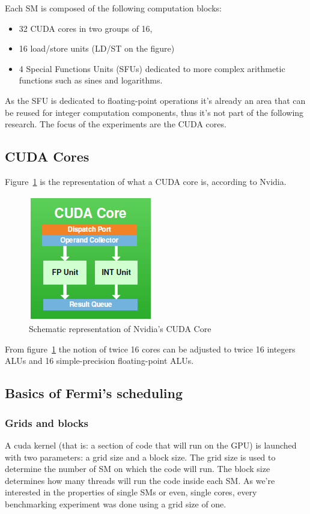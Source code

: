 \documentclass{article}
\begin{document}
    Each SM is composed of the following computation blocks:
    \begin{itemize}
        \item 32 CUDA cores in two groups of 16,
        \item 16 load/store units (LD/ST on the figure)
        \item 4 Special Functions Units (SFUs) dedicated to more complex
              arithmetic functions such as sines and logarithms.
    \end{itemize}
    
    As the SFU is dedicated to floating-point operations it's already an area
    that can be reused for integer computation components, thus it's not part
    of the following research. The focus of the experiments are the CUDA cores.

    \subsection{CUDA Cores}
    Figure~\ref{fig:CUDACore} is the representation of what a CUDA core is,
    according to Nvidia.
    
    \begin{figure}[H]
    \centering
        \includegraphics{pictures/CUDACore}
        \captionsetup{justification=centering}
        \caption{Schematic representation of Nvidia's CUDA Core}
        \label{fig:CUDACore}
    \end{figure}
    
    From figure~\ref{fig:CUDACore} the notion of twice 16 cores can be
    adjusted to twice 16 integers ALUs and 16 simple-precision floating-point
    ALUs.

    \subsection{Basics of Fermi's scheduling}
        \subsubsection{Grids and blocks} 
        A cuda kernel (that is: a section of code that will run on the GPU) is
        launched with two parameters: a grid size and a block size. The grid 
        size is used to determine the number of SM on which the code will run.
        The block size determines how many threads will run the code inside each
        SM. As we're interested in the properties of single SMs or even, single
        cores, every benchmarking experiment was done using a grid size of one.
\end{document}
